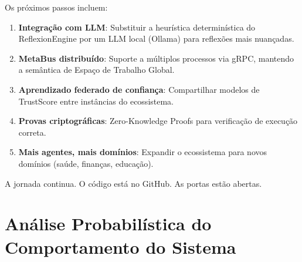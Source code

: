Os próximos passos incluem:

\begin{enumerate}
    \item \textbf{Integração com LLM}: Substituir a heurística determinística do ReflexionEngine por um LLM local (Ollama) para reflexões mais nuançadas.
    \item \textbf{MetaBus distribuído}: Suporte a múltiplos processos via gRPC, mantendo a semântica de Espaço de Trabalho Global.
    \item \textbf{Aprendizado federado de confiança}: Compartilhar modelos de TrustScore entre instâncias do ecossistema.
    \item \textbf{Provas criptográficas}: Zero-Knowledge Proofs para verificação de execução correta.
    \item \textbf{Mais agentes, mais domínios}: Expandir o ecossistema para novos domínios (saúde, finanças, educação).
\end{enumerate}

A jornada continua. O código está no GitHub. As portas estão abertas.

\begin{center}
\end{center}

\section{Análise Probabilística do Comportamento do Sistema}
\label{sec:probabilistic}

